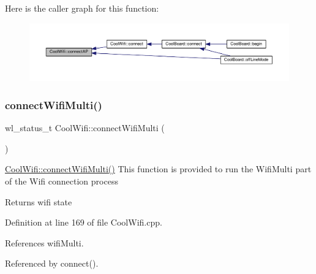 Here is the caller graph for this function\+:\nopagebreak
\begin{figure}[H]
\begin{center}
\leavevmode
\includegraphics[width=350pt]{classCoolWifi_a7c857f27161782f5ef1d62d552aff971_icgraph}
\end{center}
\end{figure}
\mbox{\label{classCoolWifi_a419de92d738f14b7444cf822b3ab0070}} 
\subsubsection{\texorpdfstring{connect\+Wifi\+Multi()}{connectWifiMulti()}}
{\footnotesize\ttfamily wl\+\_\+status\+\_\+t Cool\+Wifi\+::connect\+Wifi\+Multi (\begin{DoxyParamCaption}{ }\end{DoxyParamCaption})}

\hyperlink{classCoolWifi_a419de92d738f14b7444cf822b3ab0070}{Cool\+Wifi\+::connect\+Wifi\+Multi()} This function is provided to run the Wifi\+Multi part of the Wifi connection process

\begin{DoxyReturn}{Returns}
wifi state 
\end{DoxyReturn}


Definition at line 169 of file Cool\+Wifi.\+cpp.



References wifi\+Multi.



Referenced by connect().


